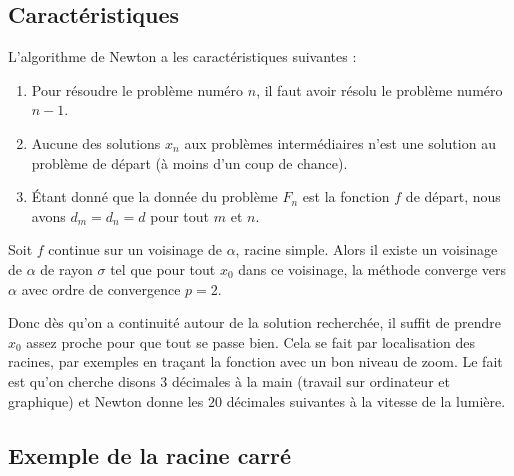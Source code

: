 \subsection{Caractéristiques}

L'algorithme de Newton a les caractéristiques suivantes :
\begin{enumerate}

	\item
		Pour résoudre le problème numéro $n$, il faut avoir résolu le problème numéro $n-1$.
	\item
		Aucune des solutions $x_n$ aux problèmes intermédiaires n'est une solution au problème de départ (à moins d'un coup de chance).
	\item
		Étant donné que la donnée du problème $F_n$ est la fonction $f$ de départ, nous avons $d_m=d_n=d$ pour tout $m$ et $n$.
\end{enumerate}

\begin{theorem}     \label{THOooMACHooLofCVu}
    Soit \( f\) continue sur un voisinage de \( \alpha\), racine simple. Alors il existe un voisinage de \( \alpha\) de rayon \( \sigma\) tel que pour tout \( x_0\) dans ce voisinage, la méthode converge vers \( \alpha\) avec ordre de convergence \( p=2\).
\end{theorem}

Donc dès qu'on a continuité autour de la solution recherchée, il suffit de prendre \( x_0\) assez proche pour que tout se passe bien. Cela se fait par localisation des racines, par exemples en traçant la fonction avec un bon niveau de zoom. Le fait est qu'on cherche disons \( 3\) décimales à la main (travail sur ordinateur et graphique) et Newton donne les \( 20\) décimales suivantes à la vitesse de la lumière.

\subsection{Exemple de la racine carré}

